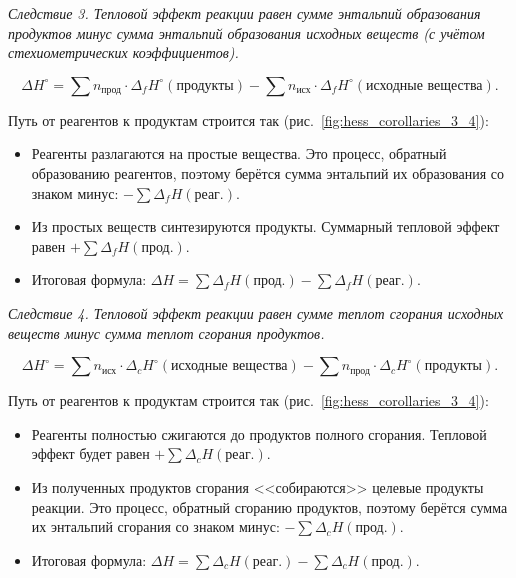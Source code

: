 \emph{Следствие 3. Тепловой эффект реакции равен сумме энтальпий образования продуктов минус сумма энтальпий образования исходных веществ (с учётом стехиометрических коэффициентов).}

\begin{equation*}
    \boxed{\Delta{}H^{\circ} = \sum n_{\text{прод}} \cdot \Delta{}_fH^{\circ}(\text{продукты}) - \sum n_{\text{исх}} \cdot \Delta{}_fH^{\circ}(\text{исходные вещества})}.
\end{equation*}

Путь от реагентов к продуктам строится так (рис.~\ref{fig:hess_corollaries_3_4}):

\begin{itemize}
    \item Реагенты разлагаются на простые вещества. Это процесс, обратный образованию реагентов, поэтому берётся сумма энтальпий их образования со знаком минус: $-\sum \Delta{}_fH(\text{реаг.})$.
    \item Из простых веществ синтезируются продукты. Суммарный тепловой эффект равен $+\sum \Delta{}_fH(\text{прод.})$.
    \item Итоговая формула: $\Delta H = \sum \Delta{}_fH(\text{прод.}) - \sum \Delta{}_fH(\text{реаг.})$.
\end{itemize}

\emph{Следствие 4. Тепловой эффект реакции равен сумме теплот сгорания исходных веществ минус сумма теплот сгорания продуктов.}

\begin{equation*}
    \boxed{\Delta{}H^{\circ} = \sum n_{\text{исх}} \cdot \Delta{}_cH^{\circ}(\text{исходные вещества}) - \sum n_{\text{прод}} \cdot \Delta{}_cH^{\circ}(\text{продукты})}.
\end{equation*}

Путь от реагентов к продуктам строится так (рис.~\ref{fig:hess_corollaries_3_4}):

\begin{itemize}
    \item Реагенты полностью сжигаются до продуктов полного сгорания. Тепловой эффект будет равен $+\sum \Delta{}_cH(\text{реаг.})$.
    \item Из полученных продуктов сгорания <<собираются>> целевые продукты реакции. Это процесс, обратный сгоранию продуктов, поэтому берётся сумма их энтальпий сгорания со знаком минус: $-\sum \Delta{}_cH(\text{прод.})$.
    \item Итоговая формула: $\Delta H = \sum \Delta{}_cH(\text{реаг.}) - \sum \Delta{}_cH(\text{прод.})$.
\end{itemize}

